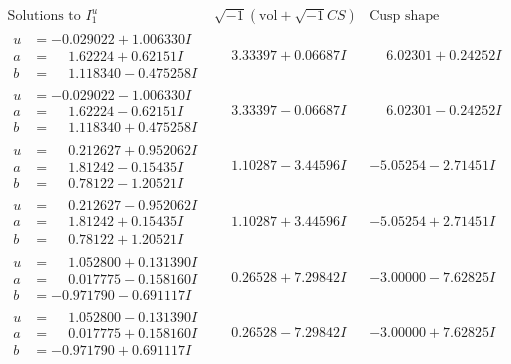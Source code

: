 \documentclass[1p]{elsarticle_modified}
\theoremstyle{definition}
\newcommand{\I}{\sqrt{-1}}
\begin{document}
$$\begin{array}{c|c|c}  
\text{Solutions to }I^u_{1}& \I (\text{vol} + \sqrt{-1}CS) & \text{Cusp shape}\\
 \hline 
\begin{aligned}
u &= -0.029022 + 1.006330 I \\
a &= \phantom{-}1.62224 + 0.62151 I \\
b &= \phantom{-}1.118340 - 0.475258 I\end{aligned}
 & \phantom{-}3.33397 + 0.06687 I & \phantom{-}6.02301 + 0.24252 I \\ \hline\begin{aligned}
u &= -0.029022 - 1.006330 I \\
a &= \phantom{-}1.62224 - 0.62151 I \\
b &= \phantom{-}1.118340 + 0.475258 I\end{aligned}
 & \phantom{-}3.33397 - 0.06687 I & \phantom{-}6.02301 - 0.24252 I \\ \hline\begin{aligned}
u &= \phantom{-}0.212627 + 0.952062 I \\
a &= \phantom{-}1.81242 - 0.15435 I \\
b &= \phantom{-}0.78122 - 1.20521 I\end{aligned}
 & \phantom{-}1.10287 - 3.44596 I & -5.05254 - 2.71451 I \\ \hline\begin{aligned}
u &= \phantom{-}0.212627 - 0.952062 I \\
a &= \phantom{-}1.81242 + 0.15435 I \\
b &= \phantom{-}0.78122 + 1.20521 I\end{aligned}
 & \phantom{-}1.10287 + 3.44596 I & -5.05254 + 2.71451 I \\ \hline\begin{aligned}
u &= \phantom{-}1.052800 + 0.131390 I \\
a &= \phantom{-}0.017775 - 0.158160 I \\
b &= -0.971790 - 0.691117 I\end{aligned}
 & \phantom{-}0.26528 + 7.29842 I & -3.00000 - 7.62825 I \\ \hline\begin{aligned}
u &= \phantom{-}1.052800 - 0.131390 I \\
a &= \phantom{-}0.017775 + 0.158160 I \\
b &= -0.971790 + 0.691117 I\end{aligned}
 & \phantom{-}0.26528 - 7.29842 I & -3.00000 + 7.62825 I \\ \hline\begin{aligned}

\end{aligned}
\end{array}$$
\end{document}

